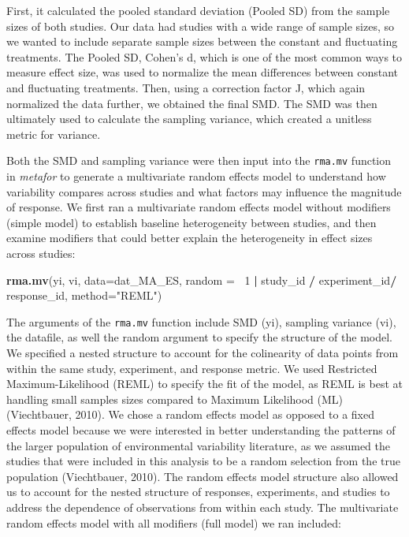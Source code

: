 \documentclass[12pt,twoside]{reedthesis}
\newenvironment{Shaded}{\begin{snugshade}}{\end{snugshade}}
\newcommand{\DataTypeTok}[1]{\textcolor[rgb]{0.13,0.29,0.53}{#1}}
\newcommand{\DecValTok}[1]{\textcolor[rgb]{0.00,0.00,0.81}{#1}}
\newcommand{\KeywordTok}[1]{\textcolor[rgb]{0.13,0.29,0.53}{\textbf{#1}}}
\newcommand{\NormalTok}[1]{#1}
\newcommand{\OperatorTok}[1]{\textcolor[rgb]{0.81,0.36,0.00}{\textbf{#1}}}
\newcommand{\StringTok}[1]{\textcolor[rgb]{0.31,0.60,0.02}{#1}}
\begin{document}
First, it calculated the pooled standard deviation (Pooled SD) from the sample sizes of both studies. Our data had studies with a wide range of sample sizes, so we wanted to include separate sample sizes between the constant and fluctuating treatments. The Pooled SD, Cohen's d, which is one of the most common ways to measure effect size, was used to normalize the mean differences between constant and fluctuating treatments. Then, using a correction factor J, which again normalized the data further, we obtained the final SMD. The SMD was then ultimately used to calculate the sampling variance, which created a unitless metric for variance.

Both the SMD and sampling variance were then input into the \texttt{rma.mv} function in \emph{metafor} to generate a multivariate random effects model to understand how variability compares across studies and what factors may influence the magnitude of response. We first ran a multivariate random effects model without modifiers (simple model) to establish baseline heterogeneity between studies, and then examine modifiers that could better explain the heterogeneity in effect sizes across studies:
\begin{Shaded}
\begin{Highlighting}[]
\KeywordTok{rma.mv}\NormalTok{(yi, vi, }
       \DataTypeTok{data=}\NormalTok{dat_MA_ES, }
       \DataTypeTok{random =} \OperatorTok{~}\DecValTok{1} \OperatorTok{|}\StringTok{ }\NormalTok{study_id }\OperatorTok{/}\StringTok{ }\NormalTok{experiment_id}\OperatorTok{/}\StringTok{ }\NormalTok{response_id, }
       \DataTypeTok{method=}\StringTok{"REML"}\NormalTok{) }
\end{Highlighting}
\end{Shaded}
The arguments of the \texttt{rma.mv} function include SMD (yi), sampling variance (vi), the datafile, as well the random argument to specify the structure of the model. We specified a nested structure to account for the colinearity of data points from within the same study, experiment, and response metric. We used Restricted Maximum-Likelihood (REML) to specify the fit of the model, as REML is best at handling small samples sizes compared to Maximum Likelihood (ML) (Viechtbauer, 2010). We chose a random effects model as opposed to a fixed effects model because we were interested in better understanding the patterns of the larger population of environmental variability literature, as we assumed the studies that were included in this analysis to be a random selection from the true population (Viechtbauer, 2010). The random effects model structure also allowed us to account for the nested structure of responses, experiments, and studies to address the dependence of observations from within each study. The multivariate random effects model with all modifiers (full model) we ran included:
\end{document}

